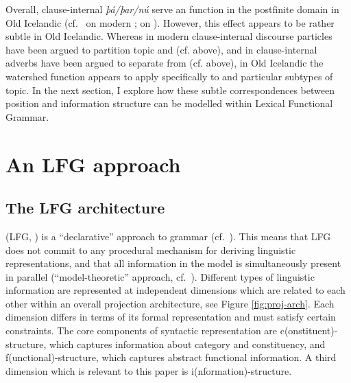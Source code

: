 \documentclass[output=paper,colorlinks,citecolor=brown]{langscibook}
\begin{document}
Overall, clause-internal  \textit{þá/þar/nú} serve an  function in the postfinite domain in Old Icelandic (cf.~\citealp{krivonosov1977deutsche,grosz2016information} on modern ; \citealp{vanKem-Los2006,vanKem2008balance,vanKemenade2009discourse,vanKem2011syntax,vanKem2020discourse} on ). However, this effect appears to be rather subtle in Old Icelandic. Whereas in modern  clause-internal discourse particles have been argued to partition topic and  (cf.  above), and in  clause-internal adverbs have been argued to separate  from  (cf.  above), in Old Icelandic the watershed function appears to apply specifically to  and particular subtypes of topic. In the next section, I explore how these subtle correspondences between position and information structure can be modelled within Lexical Functional Grammar. 


\section{An LFG approach}\label{sect:lfg}
\subsection{The LFG architecture}\label{subsect:lfg-basics}

 (LFG, \citealp{bresnan-kaplan82,Bresnan2015lexical,dalrymple2019oxford}) is a ``declarative'' approach to grammar (cf.~\citealp{levine2006declarative,sells2021view}). This means that LFG does not commit to any procedural mechanism for deriving linguistic representations, and that all information in the model is  simultaneously present in parallel (``model-theoretic'' approach, cf.~\citealp{pullum2001distinction}). Different types of linguistic information are represented at independent dimensions which are related to each other within an overall projection architecture, see Figure \ref{fig:proj-arch}. Each dimension differs in terms of its formal representation and must satisfy certain constraints. The core components of syntactic representation are c(onstituent)-structure, which captures information about category and constituency, and f(unctional)-structure, which captures abstract functional information. A third dimension which is relevant to this paper is i(nformation)-structure.
\end{document}

